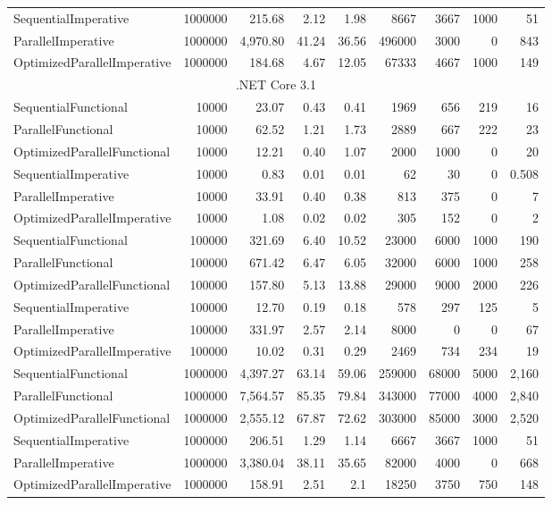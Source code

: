 \begin{table}
\begin{tabularx}{\linewidth}{Xrrrrrrrr}
SequentialImperative	&	1000000	&	215.68	&	2.12	&	1.98	&	8667	&	3667	&	1000	&	51	\\
ParallelImperative	&	1000000	&	4,970.80	&	41.24	&	36.56	&	496000	&	3000	&	0	&	843	\\
OptimizedParallelImperative	&	1000000	&	184.68	&	4.67	&	12.05	&	67333	&	4667	&	1000	&	149	\\
      \midrule
			\multicolumn{9}{c}{.NET Core 3.1} \\ 
			\midrule 
SequentialFunctional	&	10000	&	23.07	&	0.43	&	0.41	&	1969	&	656	&	219	&	16	\\
ParallelFunctional	&	10000	&	62.52	&	1.21	&	1.73	&	2889	&	667	&	222	&	23	\\
OptimizedParallelFunctional	&	10000	&	12.21	&	0.40	&	1.07	&	2000	&	1000	&	0	&	20	\\
SequentialImperative	&	10000	&	0.83	&	0.01	&	0.01	&	62	&	30	&	0	&	0.508	\\
ParallelImperative	&	10000	&	33.91	&	0.40	&	0.38	&	813	&	375	&	0	&	7	\\
OptimizedParallelImperative	&	10000	&	1.08	&	0.02	&	0.02	&	305	&	152	&	0	&	2	\\
SequentialFunctional	&	100000	&	321.69	&	6.40	&	10.52	&	23000	&	6000	&	1000	&	190	\\
ParallelFunctional	&	100000	&	671.42	&	6.47	&	6.05	&	32000	&	6000	&	1000	&	258	\\
OptimizedParallelFunctional	&	100000	&	157.80	&	5.13	&	13.88	&	29000	&	9000	&	2000	&	226	\\
SequentialImperative	&	100000	&	12.70	&	0.19	&	0.18	&	578	&	297	&	125	&	5	\\
ParallelImperative	&	100000	&	331.97	&	2.57	&	2.14	&	8000	&	0	&	0	&	67	\\
OptimizedParallelImperative	&	100000	&	10.02	&	0.31	&	0.29	&	2469	&	734	&	234	&	19	\\
SequentialFunctional	&	1000000	&	4,397.27	&	63.14	&	59.06	&	259000	&	68000	&	5000	&	2,160	\\
ParallelFunctional	&	1000000	&	7,564.57	&	85.35	&	79.84	&	343000	&	77000	&	4000	&	2,840	\\
OptimizedParallelFunctional	&	1000000	&	2,555.12	&	67.87	&	72.62	&	303000	&	85000	&	3000	&	2,520	\\
SequentialImperative	&	1000000	&	206.51	&	1.29	&	1.14	&	6667	&	3667	&	1000	&	51	\\
ParallelImperative	&	1000000	&	3,380.04	&	38.11	&	35.65	&	82000	&	4000	&	0	&	668	\\
OptimizedParallelImperative	&	1000000	&	158.91	&	2.51	&	2.1	&	18250	&	3750	&	750	&	148	\\

			\bottomrule
    \end{tabularx}
\end{table}

